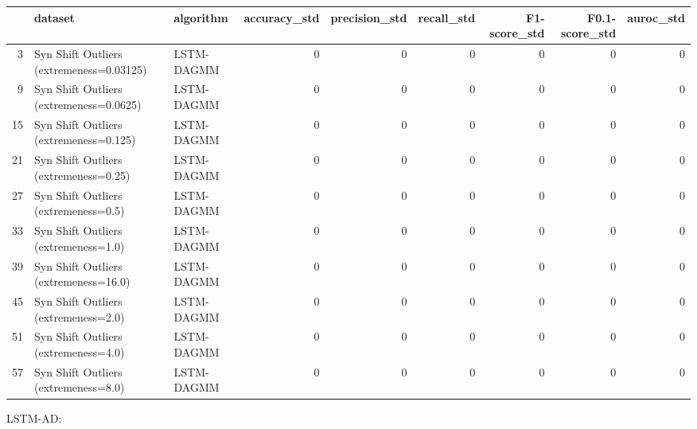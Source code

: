 \begin{tabular}{rllrrrrrr}
\hline
    & dataset                                  & algorithm   &   accuracy\_std &   precision\_std &   recall\_std &   F1-score\_std &   F0.1-score\_std &   auroc\_std \\
\hline
  3 & Syn Shift Outliers (extremeness=0.03125) & LSTM-DAGMM  &              0 &               0 &            0 &              0 &                0 &           0 \\
  9 & Syn Shift Outliers (extremeness=0.0625)  & LSTM-DAGMM  &              0 &               0 &            0 &              0 &                0 &           0 \\
 15 & Syn Shift Outliers (extremeness=0.125)   & LSTM-DAGMM  &              0 &               0 &            0 &              0 &                0 &           0 \\
 21 & Syn Shift Outliers (extremeness=0.25)    & LSTM-DAGMM  &              0 &               0 &            0 &              0 &                0 &           0 \\
 27 & Syn Shift Outliers (extremeness=0.5)     & LSTM-DAGMM  &              0 &               0 &            0 &              0 &                0 &           0 \\
 33 & Syn Shift Outliers (extremeness=1.0)     & LSTM-DAGMM  &              0 &               0 &            0 &              0 &                0 &           0 \\
 39 & Syn Shift Outliers (extremeness=16.0)    & LSTM-DAGMM  &              0 &               0 &            0 &              0 &                0 &           0 \\
 45 & Syn Shift Outliers (extremeness=2.0)     & LSTM-DAGMM  &              0 &               0 &            0 &              0 &                0 &           0 \\
 51 & Syn Shift Outliers (extremeness=4.0)     & LSTM-DAGMM  &              0 &               0 &            0 &              0 &                0 &           0 \\
 57 & Syn Shift Outliers (extremeness=8.0)     & LSTM-DAGMM  &              0 &               0 &            0 &              0 &                0 &           0 \\
\hline
\end{tabular}

LSTM-AD:


